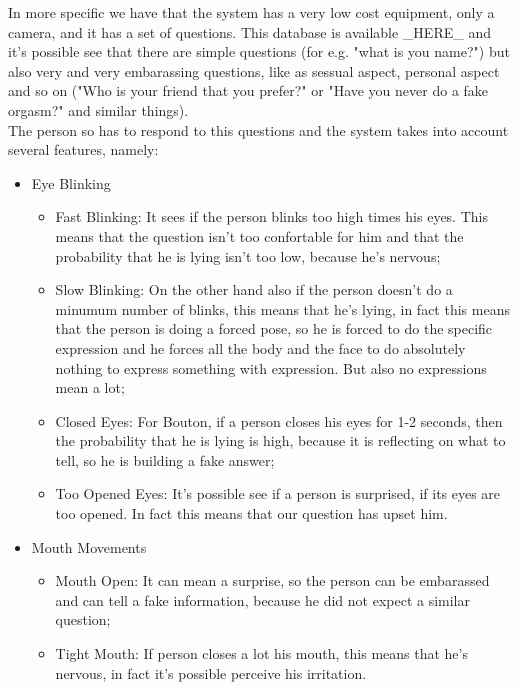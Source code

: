 \documentclass[12pt]{article}
\begin{document}
In more specific we have that the system has a very low cost equipment, only a camera, and it has a set of questions. This database is available \_HERE\_ and it's possible see that there are simple questions (for e.g. "what is you name?") but also very and very embarassing questions, like as sessual aspect, personal aspect and so on ("Who is your friend that you prefer?" or "Have you never do a fake orgasm?" and similar things). \\
The person so has to respond to this questions and the system takes into account several features, namely:
\begin{itemize}
    \item Eye Blinking
    \begin{itemize}
        \item Fast Blinking: It sees if the person blinks too high times his eyes. This means that the question isn't too confortable for him and that the probability that he is lying isn't too low, because he's nervous;
        
        \item Slow Blinking: On the other hand also if the person doesn't do a minumum number of blinks, this means that he's lying, in fact this means that the person is doing a forced pose, so he is forced to do the specific expression and he forces all the body and the face to do absolutely nothing to express something with expression. But also no expressions mean a lot;
        
        \item Closed Eyes: For Bouton, if a person closes his eyes for 1-2 seconds, then the probability that he is lying is high, because it is reflecting on what to tell, so he is building a fake answer;
        
        \item Too Opened Eyes: It's possible see if a person is surprised, if its eyes are too opened. In fact this means that our question has upset him.
    
    \end{itemize}
    \item Mouth Movements
    \begin{itemize}
    
        \item Mouth Open: It can mean a surprise, so the person can be embarassed and can tell a fake information, because he did not expect a similar question;
        
        \item Tight Mouth: If person closes a lot his mouth, this means that he's nervous, in fact it's possible perceive his irritation.
        

\end{itemize}
\end{itemize}
\end{document}
